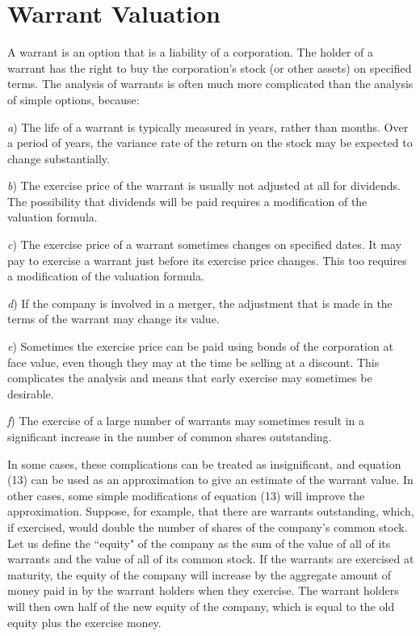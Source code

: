 \documentclass[a4paper, 12pt, twoside]{article}
\begin{document}
\section*{Warrant Valuation}

A warrant is an option that is a liability of a corporation. The holder of a warrant 
has the right to buy the corporation's stock (or other assets) on specified terms. The 
analysis of warrants is often much more complicated than the analysis of simple 
options, because:

\textit{a}) The life of a warrant is typically measured in years, rather than months. Over a 
period of years, the variance rate of the return on the stock may be expected to 
change substantially.

\textit{b}) The exercise price of the warrant is usually not adjusted at all for dividends. The 
possibility that dividends will be paid requires a modification of the valuation 
formula.

\textit{c}) The exercise price of a warrant sometimes changes on specified dates. It may pay to 
exercise a warrant just before its exercise price changes. This too requires a 
modification of the valuation formula.

\textit{d}) If the company is involved in a merger, the adjustment that is made in the terms of 
the warrant may change its value.

\textit{e}) Sometimes the exercise price can be paid using bonds of the corporation at face 
value, even though they may at the time be selling at a discount. This complicates the 
analysis and means that early exercise may sometimes be desirable.

\textit{f}) The exercise of a large number of warrants may sometimes result in a significant 
increase in the number of common shares outstanding.

In some cases, these complications can be treated as insignificant, and equation (13) 
can be used as an approximation to give an estimate of the warrant value. In other 
cases, some simple modifications of equation (13) will improve the approximation. 
Suppose, for example, that there are warrants outstanding, which, if exercised, would 
double the number of shares of the company's common stock. Let us define the ``equity" 
of the company as the sum of the value of all of its warrants and the value of all of 
its common stock. If the warrants are exercised at maturity, the equity of the company 
will increase by the aggregate amount of money paid in by the warrant holders when 
they exercise. The warrant holders will then own half of the new equity of the 
company, which is equal to the old equity plus the exercise money.
\end{document}
